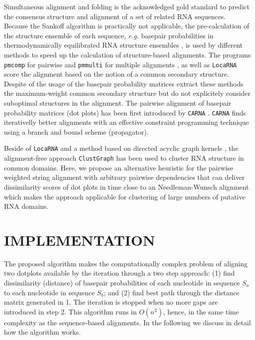 \documentclass[a4paper,twoside]{article}
\newcommand\pmcomp{\texttt{pmcomp}}
\newcommand\pmmulti{\texttt{pmmulti}}
\newcommand\clustgraph{\texttt{ClustGraph}}
\newcommand\locarna{\texttt{LocaRNA}}
\newcommand\carna{\texttt{CARNA}}
\newcommand\eg{\textit{e.g.}}
\begin{document}
Simultaneous alignment and folding \cite{sankoff85} is the acknowledged gold
standard to predict the consensus structure and alignment of a set of related
RNA sequences. Because the Sankoff algorithm is practically not applicable, the
pre-calculation of the structure ensemble of each sequence, \eg{} basepair
probabilities in thermodynamically equilibrated RNA structure ensembles
\cite{McCaskill:1990}, is used by different methods to speed up the calculation
of structure-based alignments. The programs \pmcomp{} for pairwise and
\pmmulti{} for multiple alignments \cite{Hofacker15073017}, as well as
\locarna{} \cite{Will17432929} score the alignment based on the notion of a
common secondary structure. Despite of the usage of the basepair probability
matrices extract these methods the maximum-weight common secondary structure but
do not explicitely consider suboptimal structures in the alignment. The pairwise
alignment of basepair probability matrices (dot plots) has been first introduced
by \carna{} \cite{Palu2010,Sorescu2012}. \carna{} finds iterativelly better
alignments with an effective constraint programming technique using a branch and
bound scheme (propagator).

Beside of \locarna{} and a method based on directed acyclic graph kernels
\cite{Sato18647390}, the alignment-free approach \clustgraph{}
\cite{Heyne22689765} has been used to cluster RNA structure in common domains.
Here, we propose an alternative heuristic for the pairwise weighted string
alignment with arbitrary pairwise dependencies that can deliver dissimilarity
scores of dot plots in time close to an Needleman-Wunsch alignment which makes
the approach applicable for clustering of large numbers of putative RNA domains.


\section{\uppercase{Implementation}}

\noindent The proposed algorithm makes the computationally complex problem of
aligning two dotplots available by the iteration through a two step approach:
(1) find dissimilarity (distance) of basepair probabilities of each nucleotide
in sequence $S_a$ to each nucleotide in sequence $S_b$; and (2) find best path
through the distance matrix generated in 1. The iteration is stopped when no
more gaps are introduced in step 2. This algorithm runs in $O(n^2)$, hence, in
the same time complexity as the sequence-based alignments.  In the following we
discuss in detail how the algorithm works.
\end{document}
